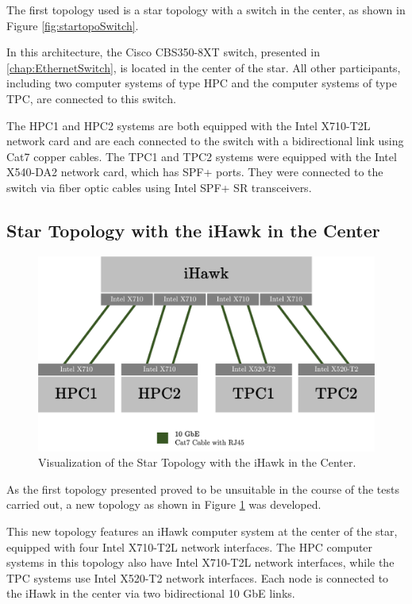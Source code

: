 The first topology used is a star topology with a switch in the center, as shown in Figure \ref{fig:startopoSwitch}.

In this architecture, the Cisco CBS350-8XT switch, presented in \ref{chap:EthernetSwitch}, is located in the center of the star. All other participants, including two computer systems of type HPC and the computer systems of type TPC, are connected to this switch.

The HPC1 and HPC2 systems are both equipped with the Intel X710-T2L network card and are each connected to the switch with a bidirectional link using Cat7 copper cables. The TPC1 and TPC2 systems were equipped with the Intel X540-DA2 network card, which has SPF+ ports. They were connected to the switch via fiber optic cables using Intel SPF+ SR transceivers.

\subsection{Star Topology with the iHawk in the Center} \label{chap:TopoiHawk}

\begin{figure}[h!]
    \centering
    \includegraphics[width=1\linewidth]{figures/method/topo3.png}
    \caption[Visualization of the Star Topology with the iHawk in the Center]{Visualization of the Star Topology with the iHawk in the Center.}
    \label{fig:startopoIHawk}
\end{figure}

As the first topology presented proved to be unsuitable in the course of the tests carried out, a new topology as shown in Figure \ref{fig:startopoIHawk} was developed.

This new topology features an iHawk computer system at the center of the star, equipped with four Intel X710-T2L network interfaces. The HPC computer systems in this topology also have Intel X710-T2L network interfaces, while the TPC systems use Intel X520-T2 network interfaces. Each node is connected to the iHawk in the center via two bidirectional 10 GbE links.


